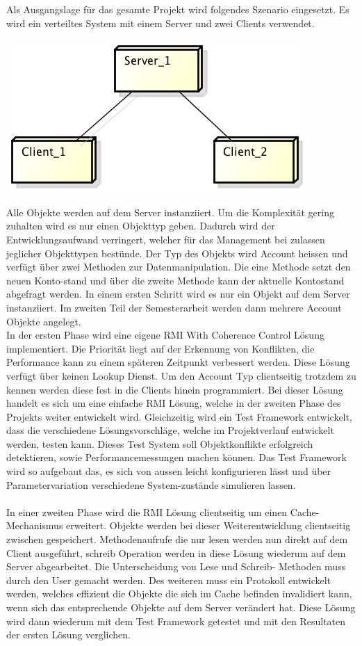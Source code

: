 \documentclass{article}
\begin{document}
Als Ausgangslage für das gesamte Projekt wird folgendes Szenario eingesetzt. Es wird ein verteiltes System mit einem Server und zwei Clients verwendet.\\
\begin{center}
\includegraphics[scale=0.85]{Deployment.png}
\end{center}
Alle Objekte werden auf dem Server instanziiert. Um die Komplexität gering zuhalten wird es nur einen Objekttyp geben. Dadurch wird der Entwicklungsaufwand verringert, welcher für das Management bei zulassen jeglicher Objekttypen bestünde. Der Typ des Objekts wird Account heissen und verfügt über zwei Methoden zur Datenmanipulation. Die eine Methode setzt den neuen Konto-stand und über die zweite Methode kann der aktuelle Kontostand abgefragt werden. In einem ersten Schritt wird es nur ein Objekt auf dem Server instanziiert. Im zweiten Teil der Semesterarbeit werden dann mehrere Account Objekte angelegt.\\
In der ersten Phase wird eine eigene RMI With Coherence Control Lösung implementiert. Die Priorität liegt auf der Erkennung von Konflikten, die Performance kann zu einem späteren Zeitpunkt verbessert werden. Diese Lösung verfügt über keinen Lookup Dienst. Um den Account Typ clientseitig trotzdem zu kennen werden diese fest in die Clients hinein programmiert. Bei dieser Lösung handelt es sich um eine einfache RMI Lösung, welche in der zweiten Phase des Projekts weiter entwickelt wird.
Gleichzeitig wird ein Test Framework entwickelt, dass die verschiedene Lösungsvorschläge, welche im Projektverlauf entwickelt werden, testen kann. Dieses Test System soll Objektkonflikte erfolgreich detektieren, sowie Performancemessungen machen können. Das Test Framework wird so aufgebaut das, es sich von aussen leicht konfigurieren lässt und über Parametervariation verschiedene System-zustände simulieren lassen.\\
\\
In einer zweiten Phase wird die RMI Lösung clientseitig um einen Cache-Mechanismus erweitert. Objekte werden bei dieser Weiterentwicklung clientseitig zwischen gespeichert. Methodenaufrufe die nur lesen werden nun direkt auf dem Client ausgeführt, schreib Operation werden in diese Lösung wiederum auf dem Server abgearbeitet. Die Unterscheidung von Lese und Schreib- Methoden muss durch den User gemacht werden. Des weiteren muss ein Protokoll entwickelt werden, welches effizient die Objekte die sich im Cache befinden invalidiert kann, wenn sich das entsprechende Objekte auf dem Server verändert hat. Diese Lösung wird dann wiederum mit dem Test Framework getestet und mit den Resultaten der ersten Lösung verglichen.\\
\end{document}
